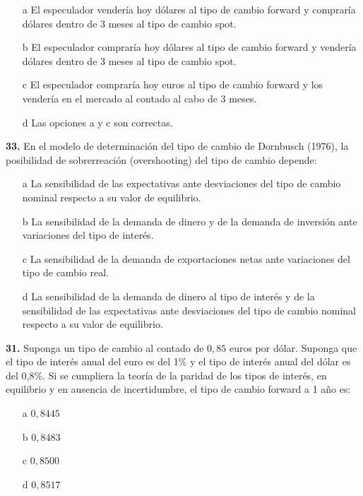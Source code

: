 \documentclass{nuevotema}
\begin{document}
\begin{itemize}
	\item[a] El especulador vendería hoy dólares al tipo de cambio forward y compraría dólares dentro de 3 meses al tipo de cambio spot.
	\item[b] El especulador compraría hoy dólares al tipo de cambio forward y vendería dólares dentro de 3 meses al tipo de cambio spot.
	\item[c] El especulador compraría hoy euros al tipo de cambio forward y los vendería en el mercado al contado al cabo de 3 meses.
	\item[d] Las opciones a y c son correctas.
\end{itemize}

\textbf{33.} En el modelo de determinación del tipo de cambio de Dornbusch (1976), la posibilidad de sobrerreación (overshooting) del tipo de cambio depende:

\begin{itemize}
	\item[a] La sensibilidad de las expectativas ante desviaciones del tipo de cambio nominal respecto a su valor de equilibrio.
	\item[b] La sensibilidad de la demanda de dinero y de la demanda de inversión ante variaciones del tipo de interés.
	\item[c] La sensibilidad de la demanda de exportaciones netas ante variaciones del tipo de cambio real.
	\item[d] La sensibilidad de la demanda de dinero al tipo de interés y de la sensibilidad de las expectativas ante desviaciones del tipo de cambio nominal respecto a su valor de equilibrio.
\end{itemize}


\textbf{31.} Suponga un tipo de cambio al contado de $0,85$ euros por dólar. Suponga que el tipo de interés anual del euro es del 1\% y el tipo de interés anual del dólar es del 0,8\%. Si se cumpliera la teoría de la paridad de los tipos de interés, en equilibrio y en ausencia de incertidumbre, el tipo de cambio forward a 1 año es:

\begin{itemize}
	\item[a] $0,8445$
	\item[b] $0,8483$
	\item[c] $0,8500$
	\item[d] $0,8517$
\end{itemize}
\end{document}
